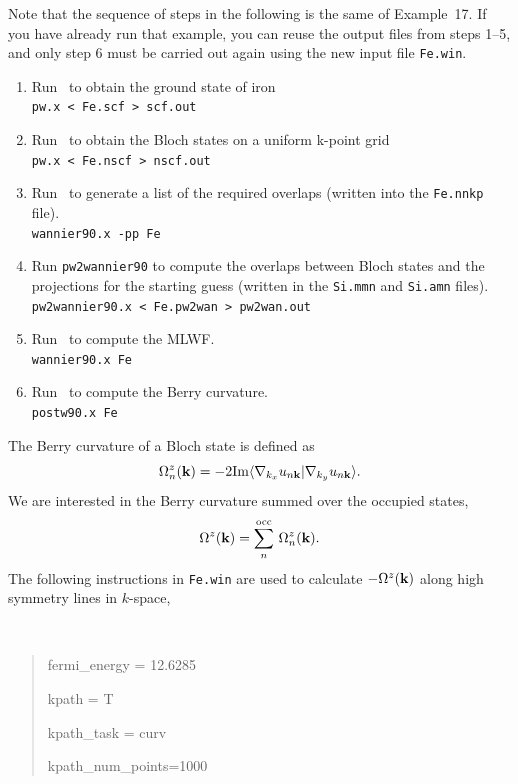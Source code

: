 \documentclass[a4paper,11pt,twoside]{article}
\begin{document}
Note that the sequence of steps in the following is the same of
Example~17.  If you have already run that example, you can reuse the
output files from steps 1--5, and only step 6 must be carried out
again using the new input file {\tt Fe.win}.

\begin{enumerate}
\item Run \pwscf\ to obtain the ground state of iron\\
{\tt pw.x < Fe.scf > scf.out}

\item Run \pwscf\ to obtain the Bloch states on a uniform k-point
  grid\\ 
{\tt pw.x < Fe.nscf > nscf.out}

\item Run \wannier\ to generate a list of the required overlaps (written
  into the {\tt Fe.nnkp} file).\\
{\tt wannier90.x -pp Fe}

\item Run {\tt pw2wannier90} to compute the overlaps between Bloch
  states and the projections for the starting guess (written in the
  {\tt Si.mmn} and {\tt  Si.amn} files).\\
{\tt pw2wannier90.x < Fe.pw2wan > pw2wan.out}

\item Run \wannier\ to compute the MLWF.\\
{\tt wannier90.x Fe}

\item Run \postw\ to compute the Berry curvature.\\
{\tt postw90.x Fe}

\end{enumerate}

The  Berry curvature of a Bloch state is defined as
$$
\Omega_n^z({\bf k})=-2{\rm Im}
\langle \nabla_{k_x} u_{n{\bf k}}\vert \nabla_{k_y} u_{n{\bf k}}\rangle.
$$
%
We are interested in the Berry curvature summed over the occupied
states,
$$
\Omega^z({\bf k})=\sum_n^{\rm occ}\,\Omega_n^z({\bf k}).
$$
%
The following instructions in {\tt Fe.win} are used to
calculate $-\Omega^z({\bf k})$ along high symmetry lines 
in
$k$-space, 
{\tt
\begin{quote}
fermi\_energy = 12.6285

kpath = T

kpath\_task = curv

kpath\_num\_points=1000
\end{quote} }
\end{document}
